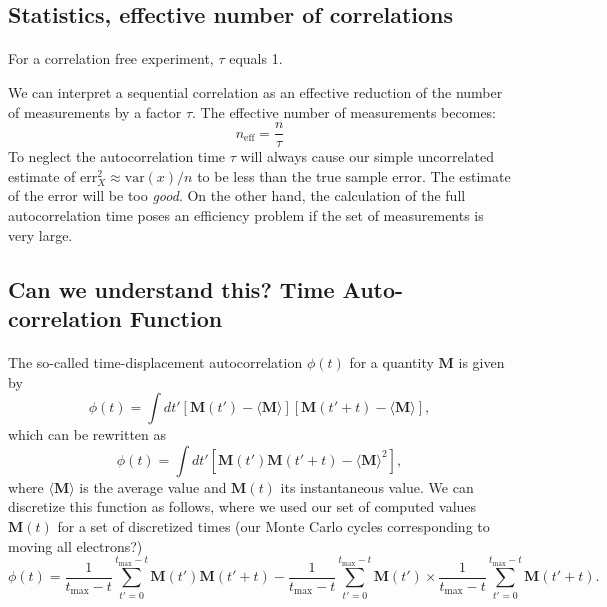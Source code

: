 \subsection*{Statistics, effective number of correlations}

\paragraph{}
For a correlation free experiment, $\tau$
equals 1.

We can interpret a sequential
correlation as an effective reduction of the number of measurements by
a factor $\tau$. The effective number of measurements becomes:
\[
n_\mathrm{eff} = \frac{n}{\tau}
\]
To neglect the autocorrelation time $\tau$ will always cause our
simple uncorrelated estimate of $\mathrm{err}_X^2\approx \mathrm{var}(x)/n$ to
be less than the true sample error. The estimate of the error will be
too \emph{good}. On the other hand, the calculation of the full
autocorrelation time poses an efficiency problem if the set of
measurements is very large.



\subsection*{Can we understand this? Time Auto-correlation Function}

\paragraph{}

The so-called time-displacement autocorrelation $\phi(t)$ for a quantity $\mathbf{M}$ is given by
\[
\phi(t) = \int dt' \left[\mathbf{M}(t')-\langle \mathbf{M} \rangle\right]\left[\mathbf{M}(t'+t)-\langle \mathbf{M} \rangle\right],
\]
which can be rewritten as 
\[
\phi(t) = \int dt' \left[\mathbf{M}(t')\mathbf{M}(t'+t)-\langle \mathbf{M} \rangle^2\right],
\]
where $\langle \mathbf{M} \rangle$ is the average value and
$\mathbf{M}(t)$ its instantaneous value. We can discretize this function as follows, where we used our
set of computed values $\mathbf{M}(t)$ for a set of discretized times (our Monte Carlo cycles corresponding to moving all electrons?)
\[
\phi(t)  = \frac{1}{t_{\mathrm{max}}-t}\sum_{t'=0}^{t_{\mathrm{max}}-t}\mathbf{M}(t')\mathbf{M}(t'+t)
-\frac{1}{t_{\mathrm{max}}-t}\sum_{t'=0}^{t_{\mathrm{max}}-t}\mathbf{M}(t')\times
\frac{1}{t_{\mathrm{max}}-t}\sum_{t'=0}^{t_{\mathrm{max}}-t}\mathbf{M}(t'+t).
\label{eq:phitf}
\]



